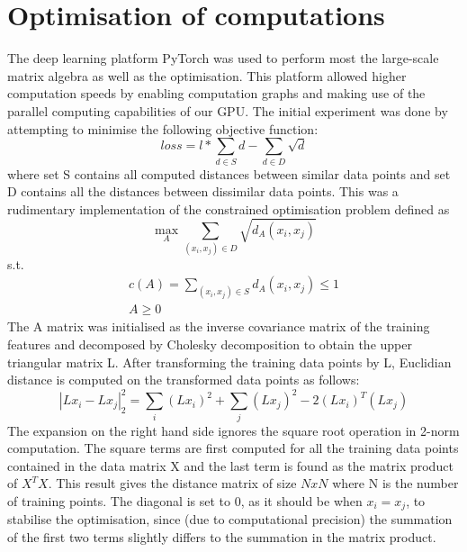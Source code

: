 \documentclass[10pt,technote]{IEEEtran}
\begin{document}
\section{Optimisation of computations}

The deep learning platform PyTorch was used to perform most the large-scale matrix algebra as well as the optimisation. This platform allowed higher computation speeds by enabling computation graphs and making use of the parallel computing capabilities of our GPU.
The initial experiment was done by attempting to minimise the following objective function: \begin{equation}
    loss = l*\sum_{d \in S}d -  \sum_{d \in D}\sqrt{d}
\end{equation}
where set S contains all computed distances between similar data points and set D contains all the distances between dissimilar data points. This was a rudimentary implementation of the constrained optimisation problem defined as
\begin{equation}
    \max_{A}\sum_{(x_i, x_j) \in D}\sqrt{d_A (x_i, x_j)}
\end{equation}
s.t.
\begin{equation}
    \begin{aligned}
        c(A) = \sum_{(x_i, x_j) \in S}d_A (x_i, x_j) \le 1 \\
        A \ge 0
    \end{aligned}
\end{equation}
The A matrix was initialised as the 
inverse covariance matrix of the training features and decomposed by Cholesky decomposition to obtain the upper triangular matrix L. After transforming the training data points by L, Euclidian distance is computed on the transformed data points as follows:
\begin{equation}
    |Lx_i - Lx_j|_2^2 = \sum_{i}(Lx_i)^2 + \sum_{j}(Lx_j)^2 - 2(Lx_i)^T(Lx_j)
\end{equation}
The expansion on the right hand side ignores the square root operation in 2-norm computation. The square terms are first computed for all the training data points contained in the data matrix X and the last term is found as the matrix product of $X^TX$. This result gives the distance matrix of size $NxN$ where N is the number of training points. The diagonal is set to 0, as it should be when $x_i = x_j$, to stabilise the optimisation, since (due to computational precision) the summation of the first two terms slightly differs to the summation in the matrix product. 




\end{document}
